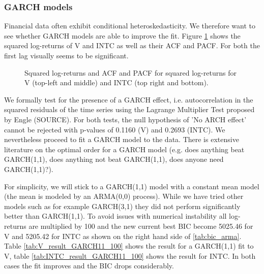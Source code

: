 \subsubsection{GARCH models}
Financial data often exhibit conditional heteroskedasticity. We therefore want to see whether GARCH models are able to improve the fit. Figure \ref{fig:V_INTC_squared} shows the squared log-returns of V and INTC as well as their ACF and PACF. For both the first lag visually seems to be significant. 

\begin{figure}[h]
    \centering
    \begin{adjustbox}{width=.95\textwidth,center}
    
    
    \end{adjustbox}
    \hspace{3ex}
    \begin{adjustbox}{width=.95\textwidth,center}
    
    \end{adjustbox}
    \begin{adjustbox}{width=.95\textwidth,center}
    
    \end{adjustbox}
    \caption{Squared log-returns and ACF and PACF for squared log-returns for V (top-left and middle) and INTC (top right and bottom). }
    \label{fig:V_INTC_squared}
\end{figure}{}

We formally test for the presence of a GARCH effect, i.e. autocorrelation in the squared residuals of the time series using the Lagrange Multiplier Test proposed by Engle (SOURCE). For both tests, the null hypothesis of 'No ARCH effect' cannot be rejected with p-values of 0.1160 (V) and 0.2693 (INTC). We nevertheless proceed to fit a GARCH model to the data. There is extensive literature on the optimal order for a GARCH model (e.g. does anything beat GARCH(1,1), does anything not beat GARCH(1,1), does anyone need GARCH(1,1)?). 

For simplicity, we will stick to a GARCH(1,1) model with a constant mean model (the mean is modeled by an ARMA(0,0) process). While we have tried other models such as for example GARCH(3,1) they did not perform significantly better than GARCH(1,1). To avoid issues with numerical instability all log-returns are multiplied by 100 and the new current best BIC become 5025.46 for V and 5205.42 for INTC as shown on the right hand side of \ref{tab:bic_arma}. Table \ref{tab:V_result_GARCH11_100} shows the result for a GARCH(1,1) fit to V, table \ref{tab:INTC_result_GARCH11_100} shows the result for INTC. In both cases the fit improves and the BIC drops considerably. 

